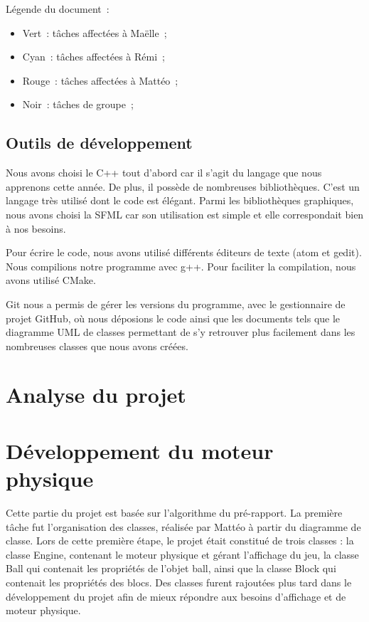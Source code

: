 \documentclass[12pt]{report}
\begin{document}
	
			Légende du document~:
			\begin{itemize}
				\item Vert~: tâches affectées à Maëlle~;
				\item Cyan~: tâches affectées à Rémi~;
				\item Rouge~: tâches affectées à Mattéo~;
				\item Noir~: tâches de groupe~;
			\end{itemize}
			
	
		\section{Outils de développement}
			Nous avons choisi le C++ tout d'abord car il s'agit du langage que nous apprenons cette année. De plus, il possède de nombreuses bibliothèques. C'est un langage très utilisé dont le code est élégant. Parmi les bibliothèques graphiques, nous avons choisi la SFML car son utilisation est simple et elle correspondait bien à nos besoins.
			
			
			Pour écrire le code, nous avons utilisé différents éditeurs de texte (atom et gedit). Nous compilions notre programme avec g++. Pour faciliter la compilation, nous avons utilisé CMake. 
			
			
			Git nous a permis de gérer les versions du programme, avec le gestionnaire de projet GitHub, où nous déposions le code ainsi que les documents tels que le diagramme UML de classes permettant de s'y retrouver plus facilement dans les nombreuses classes que nous avons créées. 

	\chapter{Analyse du projet}
	\chapter{Développement du moteur physique}
		Cette partie du projet est basée sur l'algorithme du pré-rapport. La première tâche fut l'organisation des classes, réalisée par Mattéo à partir du diagramme de classe. Lors de cette première étape, le projet était constitué de trois classes : la classe Engine, contenant le moteur physique et gérant l'affichage du jeu, la classe Ball qui contenait les propriétés de l'objet ball, ainsi que la classe Block qui contenait les propriétés des blocs. Des classes furent rajoutées plus tard dans le développement du projet afin de mieux répondre aux besoins d'affichage et de moteur physique.
		
\end{document}
